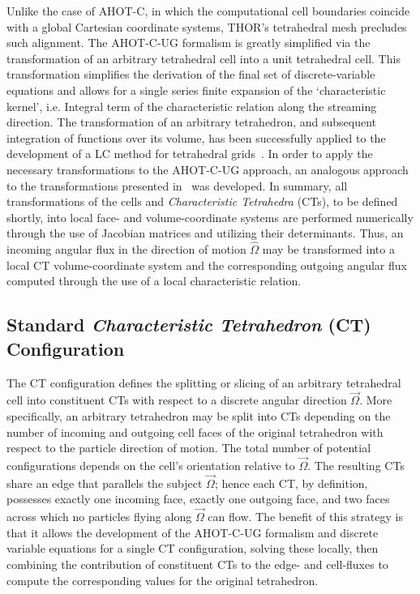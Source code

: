 Unlike the case of \ac{AHOT-C}, in which the computational cell boundaries coincide with a global Cartesian coordinate systems, \ac{THOR}'s tetrahedral mesh precludes such alignment.
The \ac{AHOT-C-UG} formalism is greatly simplified via the transformation of an arbitrary tetrahedral cell into a unit tetrahedral cell.
This transformation simplifies the derivation of the final set of discrete-variable equations and allows for a single series finite expansion of the ‘characteristic kernel’, i.e.
Integral term of the characteristic relation along the streaming direction.
The transformation of an arbitrary tetrahedron, and subsequent integration of functions over its volume, has been successfully applied to the development of a \ac{LC} method for tetrahedral grids~\cite{Mathews2000}.
In order to apply the necessary transformations to the \ac{AHOT-C-UG} approach, an analogous approach to the transformations presented in~\cite{Mathews2000} was developed.
In summary, all transformations of the cells and \textit{Characteristic Tetrahedra} (\ac{CT}s), to be defined shortly, into local face- and volume-coordinate systems are performed numerically through the use of Jacobian matrices and utilizing their determinants.
Thus, an incoming angular flux in the direction of motion $\hat{\Omega}$ may be transformed into a local \ac{CT} volume-coordinate system and the corresponding outgoing angular flux computed through the use of a local characteristic relation.


\subsection{Standard \textit{Characteristic Tetrahedron} (\ac{CT}) Configuration}

The \ac{CT} configuration defines the splitting or slicing of an arbitrary tetrahedral cell into constituent \ac{CT}s with respect to a discrete angular direction $\vec{\Omega}$.
More specifically, an arbitrary tetrahedron may be split into \ac{CT}s depending on the number of incoming and outgoing cell faces of the original tetrahedron with respect to the particle direction of motion.
The total number of potential configurations depends on the cell's orientation relative to $\vec{\Omega}$.
The resulting \ac{CT}s share an edge that parallels the subject $\vec{\Omega}$; hence each \ac{CT}, by definition, possesses exactly one incoming face, exactly one outgoing face, and two faces across which no particles flying along $\vec{\Omega}$ can flow.
The benefit of this strategy is that it allows the development of the \ac{AHOT-C-UG} formalism and discrete variable equations for a single \ac{CT} configuration, solving these locally, then combining the contribution of constituent \ac{CT}s to the edge- and cell-fluxes to compute the corresponding values for the original tetrahedron.

